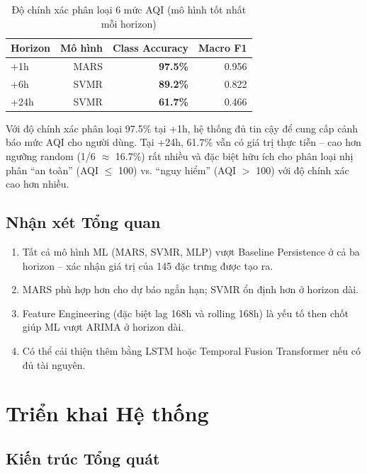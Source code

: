 \documentclass[12pt,a4paper]{report}
\newcommand{\good}[1]{{\color{cgood}\textbf{#1}}}
\newcommand{\warn}[1]{{\color{cmoderate}\textbf{#1}}}
\newcommand{\bad}[1]{{\color{cunhealthy}\textbf{#1}}}
\begin{document}
\begin{table}[H]
\centering
\caption{Độ chính xác phân loại 6 mức AQI (mô hình tốt nhất mỗi horizon)}
\label{tab:class_acc}
\begin{tabular}{lrrr}
\toprule
\textbf{Horizon} & \textbf{Mô hình} & \textbf{Class Accuracy} & \textbf{Macro F1} \\
\midrule
+1h  & MARS & \good{97.5\%} & 0.956 \\
+6h  & SVMR & \warn{89.2\%} & 0.822 \\
+24h & SVMR & \bad{61.7\%}  & 0.466 \\
\bottomrule
\end{tabular}
\end{table}

Với độ chính xác phân loại 97.5\% tại +1h, hệ thống đủ tin cậy để cung cấp cảnh báo mức AQI cho người dùng. Tại +24h, 61.7\% vẫn có giá trị thực tiễn -- cao hơn ngưỡng random (1/6 $\approx$ 16.7\%) rất nhiều và đặc biệt hữu ích cho phân loại nhị phân ``an toàn'' (AQI $\leq$ 100) vs. ``nguy hiểm'' (AQI $>$ 100) với độ chính xác cao hơn nhiều.

\section{Nhận xét Tổng quan}

\begin{enumerate}
  \item Tất cả mô hình ML (MARS, SVMR, MLP) vượt Baseline Persistence ở cả ba horizon -- xác nhận giá trị của 145 đặc trưng được tạo ra.
  \item MARS phù hợp hơn cho dự báo ngắn hạn; SVMR ổn định hơn ở horizon dài.
  \item Feature Engineering (đặc biệt lag 168h và rolling 168h) là yếu tố then chốt giúp ML vượt ARIMA ở horizon dài.
  \item Có thể cải thiện thêm bằng LSTM hoặc Temporal Fusion Transformer nếu có đủ tài nguyên.
\end{enumerate}

\chapter{Triển khai Hệ thống}

\section{Kiến trúc Tổng quát}
\end{document}
